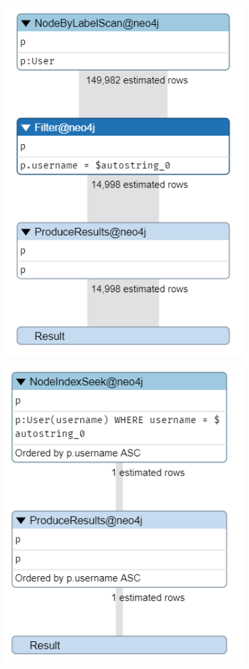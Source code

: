 \begin{figure}[H]
	\begin{subfigure}{0.5\textwidth}
		\includegraphics[width=0.9\linewidth]{img/user_without_index_1.png} 
	\end{subfigure}
	\begin{subfigure}{0.5\textwidth}
		\includegraphics[width=0.9\linewidth]{img/user_with_index_1.png}

\end{subfigure}
\end{figure}
